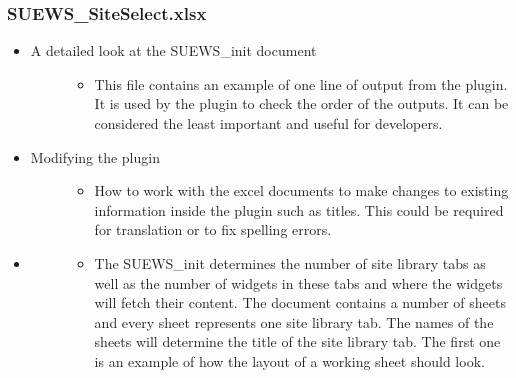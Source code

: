 \documentclass[letterpaper,10pt,english]{sphinxmanual}
\begin{document}
\subsubsection{SUEWS\_SiteSelect.xlsx}
\label{\detokenize{DevelopmentGuidelines:suews-siteselect-xlsx}}\begin{itemize}
\item {} \begin{description}
\item[{A detailed look at the SUEWS\_init document}] \leavevmode\begin{itemize}
\item {} 
This file contains an example of one line of output from the plugin. It is used by the plugin to check the order of the outputs. It can be considered the least important and useful for developers.

\end{itemize}

\end{description}

\item {} \begin{description}
\item[{Modifying the plugin}] \leavevmode\begin{itemize}
\item {} 
How to work with the excel documents to make changes to existing information inside the plugin such as titles. This could be required for translation or to fix spelling errors.

\end{itemize}

\end{description}

\item {} \begin{description}
\item[{}] \leavevmode\begin{itemize}
\item {} 
The SUEWS\_init determines the number of site library tabs as well as the number of widgets in these tabs and where the widgets will fetch their content. The document contains a number of sheets and every sheet represents one site library tab. The names of the sheets will determine the title of the site library tab. The first one is an example of how the layout of a working sheet should look.

\end{itemize}


\end{description}
\end{itemize}
\end{document}
